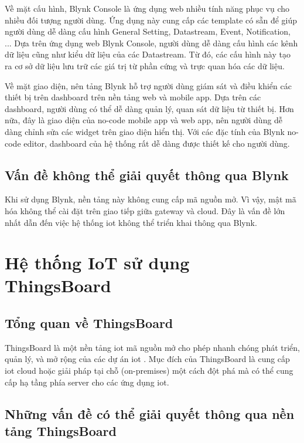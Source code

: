 Về mặt cấu hình, Blynk Console là ứng dụng web nhiều tính năng phục vụ cho nhiều đối tượng người dùng. Ứng dụng này cung cấp các template có sẵn để giúp người dùng dễ dàng cấu hình General Setting, Datastream, Event, Notification, ... Dựa trên ứng dụng web Blynk Console, người dùng dễ dàng cấu hình các kênh dữ liệu cũng như kiểu dữ liệu của các Datastream. Từ đó, các cấu hình này tạo ra cơ sở dữ liệu lưu trữ các giá trị từ phần cứng và trực quan hóa các dữ liệu.

Về mặt giao diện, nên tảng Blynk hỗ trợ người dùng giám sát và điều khiển các thiết bị trên dashboard trên nền tảng web và mobile app. Dựa trên các dashboard, người dùng có thể dễ dàng quản lý, quan sát dữ liệu từ thiết bị. Hơn nữa, đây là giao diện của no-code mobile app và web app, nên người dùng dễ dàng chỉnh sửa các widget trên giao diện hiển thị. Với các đặc tính của Blynk no-code editor, dashboard của hệ thống rất dễ dàng được thiết kế cho người dùng.

\subsection{Vấn đề không thể giải quyết thông qua Blynk}

Khi sử dụng Blynk, nền tảng này không cung cấp mã nguồn mở. Vì vậy, mật mã hóa không thể cài đặt trên giao tiếp giữa gateway và cloud. Đây là vấn đề lớn nhất dẫn đến việc hệ thống \acrshort{iot} không thể triển khai thông qua Blynk.

\section{Hệ thống IoT sử dụng ThingsBoard}

\subsection{Tổng quan về ThingsBoard}

ThingsBoard là một nền tảng \acrshort{iot} mã nguồn mở cho phép nhanh chóng phát triển, quản lý, và mở rộng của các dự án \acrshort{iot} \cite{ThingsBoard-Def-Overview}. Mục đích của ThingsBoard là cung cấp \acrshort{iot} cloud hoặc giải pháp tại chỗ (on-premises) một cách đột phá mà có thể cung cấp hạ tầng phía server cho các ứng dụng \acrshort{iot}.

\subsection{Những vấn đề có thể giải quyết thông qua nền tảng ThingsBoard}

